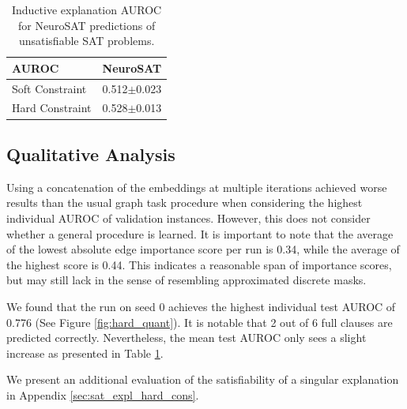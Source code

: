 \begin{table}[h]
    \centering
    \small
    \begin{tabular}{l|c}
    \textbf{AUROC} & NeuroSAT \\
    \hline
    Soft Constraint & 0.512$\pm$0.023 \\
    Hard Constraint & 0.528$\pm$0.013 \\
    \end{tabular}
    \caption[Inductive performance of PGExplainer on NeuroSAT]{Inductive explanation AUROC for NeuroSAT predictions of unsatisfiable SAT problems.}
    \label{tab:res_neuroSAT}
\end{table}

\subsection{Qualitative Analysis}
\label{sec:qual_exp_sat}

Using a concatenation of the embeddings at multiple iterations achieved worse results than the usual graph task procedure when considering the highest individual AUROC of validation instances. However, this does not consider whether a general procedure is learned. It is important to note that the average of the lowest absolute edge importance score per run is 0.34, while the average of the highest score is 0.44. This indicates a reasonable span of importance scores, but may still lack in the sense of resembling approximated discrete masks.\bigskip

We found that the run on seed 0 achieves the highest individual test AUROC of 0.776 (See Figure \ref{fig:hard_quant}). It is notable that 2 out of 6 full clauses are predicted correctly. Nevertheless, the mean test AUROC only sees a slight increase as presented in Table \ref{tab:res_neuroSAT}. \bigskip

We present an additional evaluation of the satisfiability of a singular explanation in Appendix \ref{sec:sat_expl_hard_cons}. \bigskip

